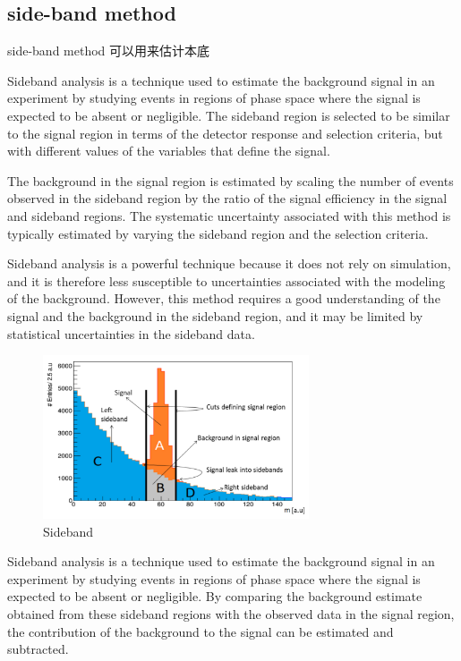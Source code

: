 \documentclass{ctexart}
\begin{document}
\subsection{side-band method}
side-band method 可以用来估计本底\newline

Sideband analysis is a technique used to estimate the background signal in an experiment by studying events in regions of phase space where the signal is expected to be absent or negligible. The sideband region is selected to be similar to the signal region in terms of the detector response and selection criteria, but with different values of the variables that define the signal.\newline

The background in the signal region is estimated by scaling the number of events observed in the sideband region by the ratio of the signal efficiency in the signal and sideband regions. The systematic uncertainty associated with this method is typically estimated by varying the sideband region and the selection criteria.\newline

Sideband analysis is a powerful technique because it does not rely on simulation, and it is therefore less susceptible to uncertainties associated with the modeling of the background. However, this method requires a good understanding of the signal and the background in the sideband region, and it may be limited by statistical uncertainties in the sideband data.
\begin{figure}[H] %
\centering %
\includegraphics[width=0.7\textwidth]{sideband.png} %
\caption{Sideband} %
\label{Sideband} %
\end{figure}

Sideband analysis is a technique used to estimate the background signal in an experiment by studying events in regions of phase space where the signal is expected to be absent or negligible. By comparing the background estimate obtained from these sideband regions with the observed data in the signal region, the contribution of the background to the signal can be estimated and subtracted.
\end{document}
